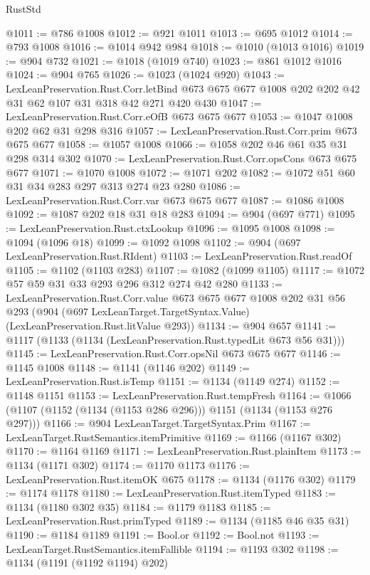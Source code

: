 \begin{lexlean}{RustStd}
\begin{coremodule}
{\begin{coremodule}
{{{{{{{{{@1011 := @786 @1008
@1012 := @921 @1011
@1013 := @695 @1012
@1014 := @793 @1008
@1016 := @1014 @942 @984
@1018 := @1010 (@1013 @1016)
@1019 := @904 @732
@1021 := @1018 (@1019 @740)
@1023 := @861 @1012 @1016
@1024 := @904 @765
@1026 := @1023 (@1024 @920)
@1043 := LexLeanPreservation.Rust.Corr.letBind
    @673
    @675
    @677
    @1008
    @202
    @202
    @42
    @31
    @62
    @107
    @31
    @318
    @42
    @271
    @420
    @430
@1047 := LexLeanPreservation.Rust.Corr.eOfB @673 @675 @677
@1053 := @1047 @1008 @202 @62 @31 @298 @316
@1057 := LexLeanPreservation.Rust.Corr.prim @673 @675 @677
@1058 := @1057 @1008
@1066 := @1058 @202 @46 @61 @35 @31 @298 @314 @302
@1070 := LexLeanPreservation.Rust.Corr.opsCons @673 @675 @677
@1071 := @1070 @1008
@1072 := @1071 @202
@1082 := @1072 @51 @60 @31 @34 @283 @297 @313 @274 @23 @280
@1086 := LexLeanPreservation.Rust.Corr.var @673 @675 @677
@1087 := @1086 @1008
@1092 := @1087 @202 @18 @31 @18 @283
@1094 := @904 (@697 @771)
@1095 := LexLeanPreservation.Rust.ctxLookup
@1096 := @1095 @1008
@1098 := @1094 (@1096 @18)
@1099 := @1092 @1098
@1102 := @904 (@697 LexLeanPreservation.Rust.RIdent)
@1103 := LexLeanPreservation.Rust.readOf
@1105 := @1102 (@1103 @283)
@1107 := @1082 (@1099 @1105)
@1117 := @1072 @57 @59 @31 @33 @293 @296 @312 @274 @42 @280
@1133 := LexLeanPreservation.Rust.Corr.value
    @673
    @675
    @677
    @1008
    @202
    @31
    @56
    @293
    (@904 (@697 LexLeanTarget.TargetSyntax.Value) (LexLeanPreservation.Rust.litValue @293))
@1134 := @904 @657
@1141 := @1117 (@1133 (@1134 (LexLeanPreservation.Rust.typedLit @673 @56 @31)))
@1145 := LexLeanPreservation.Rust.Corr.opsNil @673 @675 @677
@1146 := @1145 @1008
@1148 := @1141 (@1146 @202)
@1149 := LexLeanPreservation.Rust.isTemp
@1151 := @1134 (@1149 @274)
@1152 := @1148 @1151
@1153 := LexLeanPreservation.Rust.tempFresh
@1164 := @1066 (@1107 (@1152 (@1134 (@1153 @286 @296))) @1151 (@1134 (@1153 @276 @297)))
@1166 := @904 LexLeanTarget.TargetSyntax.Prim
@1167 := LexLeanTarget.RustSemantics.itemPrimitive
@1169 := @1166 (@1167 @302)
@1170 := @1164 @1169
@1171 := LexLeanPreservation.Rust.plainItem
@1173 := @1134 (@1171 @302)
@1174 := @1170 @1173
@1176 := LexLeanPreservation.Rust.itemOK @675
@1178 := @1134 (@1176 @302)
@1179 := @1174 @1178
@1180 := LexLeanPreservation.Rust.itemTyped
@1183 := @1134 (@1180 @302 @35)
@1184 := @1179 @1183
@1185 := LexLeanPreservation.Rust.primTyped
@1189 := @1134 (@1185 @46 @35 @31)
@1190 := @1184 @1189
@1191 := Bool.or
@1192 := Bool.not
@1193 := LexLeanTarget.RustSemantics.itemFallible
@1194 := @1193 @302
@1198 := @1134 (@1191 (@1192 @1194) @202)
}}}}}}}}}
\end{coremodule}}
\end{coremodule}
\end{lexlean}
